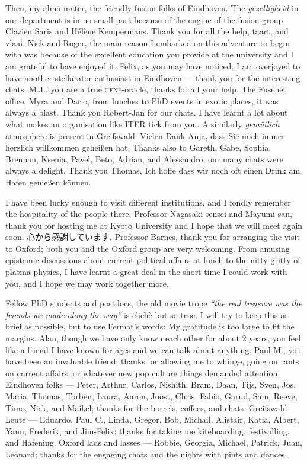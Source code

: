 \begin{CJK}{UTF8}{min}
Then, my alma mater, the friendly fusion folks of Eindhoven. The {\it gezelligheid} in our department is in no small part because of the engine of the fusion group, Clazien Saris and H\'el\`ene Kempermans. Thank you for all the help, taart, and vlaai. Niek and Roger, the main reason I embarked on this adventure to begin with was because of the excellent education you provide at the university and I am grateful to have enjoyed it. Felix, as you may have noticed, I am overjoyed to have another stellarator enthusiast in Eindhoven — thank you for the interesting chats. M.J., you are a true \textsc{gene}-oracle, thanks for all your help. The Fusenet office, Myra and Dario, from lunches to PhD events in exotic places, it was always a blast. Thank you Robert-Jan for our chats, I have learnt a lot about what makes an organisation like ITER tick from you. A similarly {\it gemütlich} atmosphere is present in Greifswald. Vielen Dank Anja, dass Sie mich immer herzlich willkommen geheißen hat. Thanks also to Gareth, Gabe, Sophia, Brennan, Ksenia, Pavel, Beto, Adrian, and Alessandro, our many chats were always a delight. Thank you Thomas, Ich hoffe dass wir noch oft einen Drink am Hafen genießen können. \par 

I have been lucky enough to visit different institutions, and I fondly remember the hospitality of the people there. Professor Nagasaki-sensei and Mayumi-san, thank you for hosting me at Kyoto University and I hope that we will meet again soon. 心から感謝しています. Professor Barnes, thank you for arranging the visit to Oxford; both you and the Oxford group are very welcoming. From amusing epistemic discussions about current political affairs at lunch to the nitty-gritty of plasma physics, I have learnt a great deal in the short time I could work with you, and I hope we may work together more. \par

Fellow PhD students and postdocs, the old movie trope {\it ``the real treasure was the friends we made along the way''} is clich\`e but so true. I will try to keep this as brief as possible, but to use Fermat's words: My gratitude is too large to fit the margins. Alan, though we have only known each other for about 2 years, you feel like a friend I have known for ages and we can talk about anything. Paul M., you have been an invaluable friend; thanks for allowing me to whinge, going on rants on current affairs, or whatever new pop culture things demanded attention. Eindhoven folks — Peter, Arthur, Carlos, Nishith, Bram, Daan, Tijs, Sven, Jos, Maria, Thomas, Torben, Laura, Aaron, Joost, Chris, Fabio, Garud, Sam, Reeve, Timo, Nick, and Maikel; thanks for the borrels, coffees, and chats. Greifswald Leute — Eduardo, Paul C., Linda, Gregor, Bob, Michail, Alistair, Katia, Albert, Yann, Frederik, and Jim-Felix; thanks for taking me kiteboarding, festivalling, and Hafening. Oxford lads and lasses — Robbie, Georgia, Michael, Patrick, Juan, Leonard; thanks for the engaging chats and the nights with pints and dances. \par 


\end{CJK}
